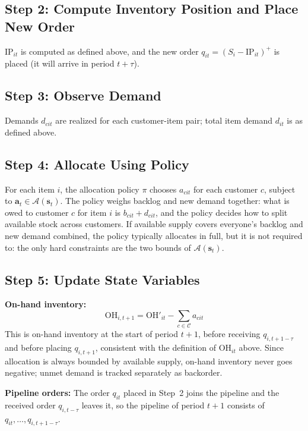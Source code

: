 \documentclass[11pt, a4paper]{article}
\theoremstyle{definition}
\theoremstyle{remark}
\newcommand{\IP}{\text{IP}}
\newcommand{\OH}{\text{OH}}
\begin{document}
\subsection{Step 2: Compute Inventory Position and Place New Order}
$\IP_{it}$ is computed as defined above, and the new order $q_{it} = (S_i - \IP_{it})^+$ is placed (it will arrive in period $t+\tau$).

\subsection{Step 3: Observe Demand}
Demands $d_{cit}$ are realized for each customer-item pair; total item demand $d_{it}$ is as defined above.

\subsection{Step 4: Allocate Using Policy}
For each item $i$, the allocation policy $\pi$ chooses $a_{cit}$ for each customer $c$, subject to $\mathbf{a}_t \in \mathcal{A}(\mathbf{s}_t)$. The policy weighs backlog and new demand together: what is owed to customer $c$ for item $i$ is $b_{cit} + d_{cit}$, and the policy decides how to split available stock across customers. If available supply covers everyone's backlog and new demand combined, the policy typically allocates in full, but it is not required to: the only hard constraints are the two bounds of $\mathcal{A}(\mathbf{s}_t)$.

\subsection{Step 5: Update State Variables}
\label{sec:update}

\textbf{On-hand inventory:}
\begin{equation}
    \OH_{i,t+1} = \OH'_{it} - \sum_{c \in \mathcal{C}} a_{cit}
\end{equation}
This is on-hand inventory at the start of period $t+1$, before receiving $q_{i,t+1-\tau}$ and before placing $q_{i,t+1}$, consistent with the definition of $\OH_{it}$ above. Since allocation is always bounded by available supply, on-hand inventory never goes negative; unmet demand is tracked separately as backorder.

\textbf{Pipeline orders:} The order $q_{it}$ placed in Step~2 joins the pipeline and the received order $q_{i,t-\tau}$ leaves it, so the pipeline of period $t+1$ consists of $q_{it}, \ldots, q_{i,t+1-\tau}$.
\end{document}
